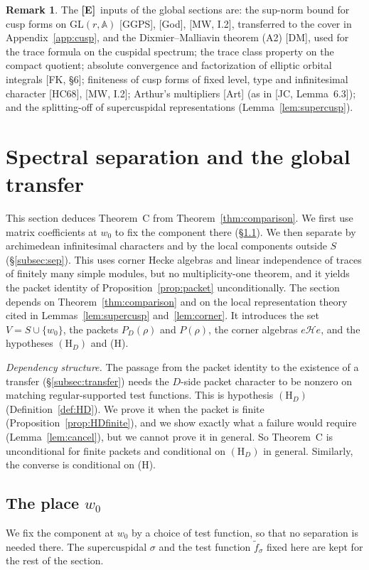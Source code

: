 \documentclass[12pt]{article}
\newcommand{\A}{\mathbb{A}}
\newcommand{\GL}{\mathrm{GL}}
\newcommand{\Ev}{\textbf{[E]}}
\theoremstyle{plain}
\theoremstyle{definition}
\newtheorem{remark}[theorem]{Remark}
\begin{document}
\begin{remark}\label{rem:Einputs}
The \Ev\ inputs of the global sections are: the sup-norm bound for cusp forms on $\GL(r,\A)$ [GGPS], [God], [MW, I.2], transferred to the cover in Appendix~\ref{app:cusp}, and the Dixmier--Malliavin theorem (A2) [DM], used for the trace formula on the cuspidal spectrum; the trace class property on the compact quotient; absolute convergence and factorization of elliptic orbital integrals [FK, \S6]; finiteness of cusp forms of fixed level, type and infinitesimal character [HC68], [MW, I.2]; Arthur's multipliers [Art] (as in [JC, Lemma~6.3]); and the splitting-off of supercuspidal representations (Lemma~\ref{lem:supercusp}).
\end{remark}

\section{Spectral separation and the global transfer}\label{sec:spectral}
This section deduces Theorem~C from Theorem~\ref{thm:comparison}. We first use matrix coefficients at $w_0$ to fix the component there (\S\ref{subsec:w0}). We then separate by archimedean infinitesimal characters and by the local components outside $S$ (\S\ref{subsec:sep}). This uses corner Hecke algebras and linear independence of traces of finitely many simple modules, but no multiplicity-one theorem, and it yields the packet identity of Proposition~\ref{prop:packet} unconditionally. The section depends on Theorem~\ref{thm:comparison} and on the local representation theory cited in Lemmas~\ref{lem:supercusp} and~\ref{lem:corner}. It introduces the set $V=S\cup\{w_0\}$, the packets $P_D(\rho)$ and $P(\rho)$, the corner algebras $e\mathcal He$, and the hypotheses $(\mathrm H_D)$ and (H).

\emph{Dependency structure.} The passage from the packet identity to the existence of a transfer (\S\ref{subsec:transfer}) needs the $D$-side packet character to be nonzero on matching regular-supported test functions. This is hypothesis $(\mathrm H_D)$ (Definition~\ref{def:HD}). We prove it when the packet is finite (Proposition~\ref{prop:HDfinite}), and we show exactly what a failure would require (Lemma~\ref{lem:cancel}), but we cannot prove it in general. So Theorem~C is unconditional for finite packets and conditional on $(\mathrm H_D)$ in general. Similarly, the converse is conditional on (H).

\subsection{The place $w_0$}\label{subsec:w0}
We fix the component at $w_0$ by a choice of test function, so that no separation is needed there. The supercuspidal $\sigma$ and the test function $\tilde f_\sigma$ fixed here are kept for the rest of the section.
\end{document}
